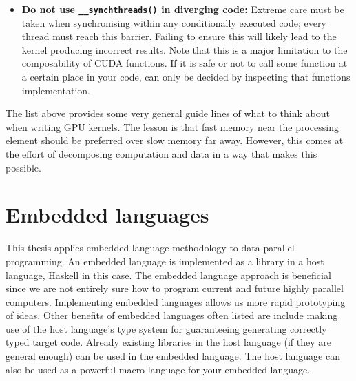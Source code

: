 \documentclass[a4paper]{book}
\begin{document}
\begin{itemize}
\item {\bf Do not use {\tt \_\_synchthreads()} in diverging code:} Extreme care must be taken 
when synchronising within any conditionally executed code; every thread must reach this barrier.
Failing to ensure this will likely lead to the kernel producing incorrect results. Note that 
this is a major limitation to the composability of CUDA functions. If it is safe or 
not to call some function at a certain place in your code, can only be decided by inspecting 
that functions implementation. 
\end{itemize} 

The list above provides some very general guide lines of what to think about when 
writing GPU kernels. The lesson is that fast memory near the processing element 
should be preferred over slow memory far away. However, this comes at the effort 
of decomposing computation and data in a way that makes this possible. 
 



%
%
\section{Embedded languages}

This thesis applies embedded language methodology to data-parallel programming. An 
embedded language is implemented as a library in a host language, Haskell in this case. 
The embedded language approach is beneficial since we are not entirely sure how 
to program current and future highly parallel computers. Implementing embedded languages allows 
us more rapid prototyping of ideas. Other benefits of embedded languages often listed 
are include making use of the host language's type system for guaranteeing generating correctly typed 
target code. Already existing libraries in the host language (if they are general enough) 
can be used in the embedded language. The host language can also be used as a powerful macro 
language for your embedded language. 
\end{document}
